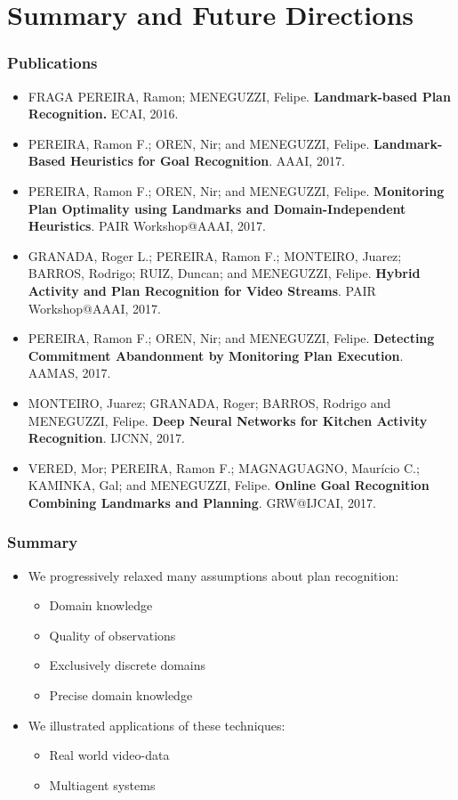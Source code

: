 \documentclass{beamer}
\begin{document}
\section{Summary and Future Directions}

\begin{frame}[c]\frametitle{Publications}
	\footnotesize
	\begin{itemize}
	\item[] FRAGA PEREIRA, Ramon; MENEGUZZI, Felipe. \textbf{Landmark-based Plan Recognition.} ECAI, 2016.
	\item[] PEREIRA, Ramon F.; OREN, Nir; and MENEGUZZI, Felipe. \textbf{Landmark-Based Heuristics for Goal Recognition}. AAAI, 2017.
	\item[] PEREIRA, Ramon F.; OREN, Nir; and MENEGUZZI, Felipe. \textbf{Monitoring Plan Optimality using Landmarks and Domain-Independent Heuristics}. PAIR Workshop@AAAI, 2017.
    \item[] GRANADA, Roger L.; PEREIRA, Ramon F.; MONTEIRO, Juarez; BARROS, Rodrigo; RUIZ, Duncan; and MENEGUZZI, Felipe. \textbf{Hybrid Activity and Plan Recognition for Video Streams}. PAIR Workshop@AAAI, 2017.
    \item[] PEREIRA, Ramon F.; OREN, Nir; and MENEGUZZI, Felipe. \textbf{Detecting Commitment Abandonment by Monitoring Plan Execution}. AAMAS, 2017.
    \item[] MONTEIRO, Juarez; GRANADA, Roger; BARROS, Rodrigo and MENEGUZZI, Felipe. \textbf{Deep Neural Networks for Kitchen Activity Recognition}. IJCNN, 2017.
    \item[] VERED, Mor; PEREIRA, Ramon F.; MAGNAGUAGNO, Maurício C.; KAMINKA, Gal; and MENEGUZZI, Felipe. \textbf{Online Goal Recognition Combining Landmarks and Planning}. GRW@IJCAI, 2017.
	\end{itemize}
\end{frame}

\begin{frame}[c]\frametitle{Summary}
	\begin{itemize}
		\item We progressively relaxed many assumptions about plan recognition:
		\begin{itemize}
			\item Domain knowledge
			\item Quality of observations
			\item Exclusively discrete domains
			\item Precise domain knowledge
		\end{itemize}
		\item We illustrated applications of these techniques:
		\begin{itemize}
			\item Real world video-data
			\item Multiagent systems
		\end{itemize}
	\end{itemize}
\end{frame}
\end{document}
